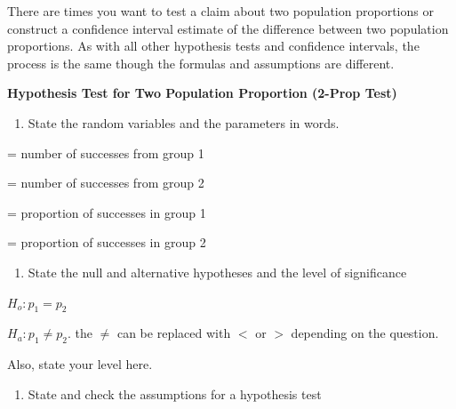 \documentclass[]{book}
\providecommand{\tightlist}{%
  \setlength{\itemsep}{0pt}\setlength{\parskip}{0pt}}
\begin{document}
There are times you want to test a claim about two population proportions or construct a confidence interval estimate of the difference between two population proportions. As with all other hypothesis tests and confidence intervals, the process is the same though the formulas and assumptions are different.

\textbf{Hypothesis Test for Two Population Proportion (2-Prop Test)}

\begin{enumerate}
\def\labelenumi{\arabic{enumi}.}
\tightlist
\item
  State the random variables and the parameters in words.
\end{enumerate}

= number of successes from group 1

= number of successes from group 2

= proportion of successes in group 1

= proportion of successes in group 2

\begin{enumerate}
\def\labelenumi{\arabic{enumi}.}
\setcounter{enumi}{1}
\tightlist
\item
  State the null and alternative hypotheses and the level of
  significance
\end{enumerate}

\(H_o:p_1=p_2\)

\(H_a: p_1\ne p_2\). the \(\ne\) can be replaced with \(<\) or \(>\) depending on the question.

Also, state your level here.

\begin{enumerate}
\def\labelenumi{\arabic{enumi}.}
\setcounter{enumi}{2}
\tightlist
\item
  State and check the assumptions for a hypothesis test
\end{enumerate}
\end{document}
